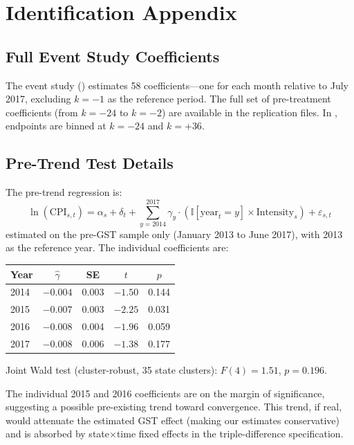 \documentclass[12pt]{article}
\newcommand{\ind}{\mathbb{I}}
\begin{document}
\section{Identification Appendix}\label{app:identification}

\subsection{Full Event Study Coefficients}

The event study () estimates 58 coefficients---one for each month relative to July 2017, excluding $k = -1$ as the reference period. The full set of pre-treatment coefficients (from $k = -24$ to $k = -2$) are available in the replication files. In , endpoints are binned at $k = -24$ and $k = +36$.

\subsection{Pre-Trend Test Details}

The pre-trend regression is:
\begin{equation}
\ln(\text{CPI}_{s,t}) = \alpha_s + \delta_t + \sum_{y=2014}^{2017} \gamma_y \cdot (\ind[\text{year}_t = y] \times \text{Intensity}_s) + \varepsilon_{s,t}
\end{equation}
estimated on the pre-GST sample only (January 2013 to June 2017), with 2013 as the reference year. The individual coefficients are:

\begin{center}
\begin{tabular}{lcccc}
\toprule
Year & $\hat{\gamma}$ & SE & $t$ & $p$ \\
\midrule
2014 & $-0.004$ & 0.003 & $-1.50$ & 0.144 \\
2015 & $-0.007$ & 0.003 & $-2.25$ & 0.031 \\
2016 & $-0.008$ & 0.004 & $-1.96$ & 0.059 \\
2017 & $-0.008$ & 0.006 & $-1.38$ & 0.177 \\
\bottomrule
\end{tabular}
\end{center}

Joint Wald test (cluster-robust, 35 state clusters): $F(4) = 1.51$, $p = 0.196$.

The individual 2015 and 2016 coefficients are on the margin of significance, suggesting a possible pre-existing trend toward convergence. This trend, if real, would attenuate the estimated GST effect (making our estimates conservative) and is absorbed by state$\times$time fixed effects in the triple-difference specification.
\end{document}
